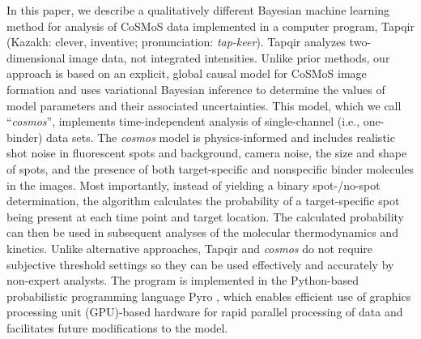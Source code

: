 

In this paper, we describe a qualitatively different Bayesian machine learning method for analysis of CoSMoS data implemented in a computer program, Tapqir (Kazakh: clever, inventive; pronunciation: \emph{tap-keer}). Tapqir analyzes two-dimensional image data, not integrated intensities.  Unlike prior methods, our approach is based on an explicit, global causal model for CoSMoS image formation and uses variational Bayesian inference \citep{Kinz-Thompson2021-tb,Gelman2013-ro} to determine the values of model parameters and their associated uncertainties. This model, which we call ``\emph{cosmos}'', implements time-independent analysis of single-channel (i.e., one-binder) data sets. The \emph{cosmos} model is physics-informed and includes realistic shot noise in fluorescent spots and background, camera noise, the size and shape of spots, and the presence of both target-specific and nonspecific binder molecules in the images. Most importantly, instead of yielding a binary spot-/no-spot determination, the algorithm calculates the probability of a target-specific spot being present at each time point and target location. The calculated probability can then be used in subsequent analyses of the molecular thermodynamics and kinetics. Unlike alternative approaches, Tapqir and \emph{cosmos} do not require subjective threshold settings so they can be used effectively and accurately by non-expert analysts. The program is implemented in the Python-based probabilistic programming language Pyro \citep{Bingham2019-qy}, which enables efficient use of graphics processing unit (GPU)-based hardware for rapid parallel processing of data and facilitates future modifications to the model.